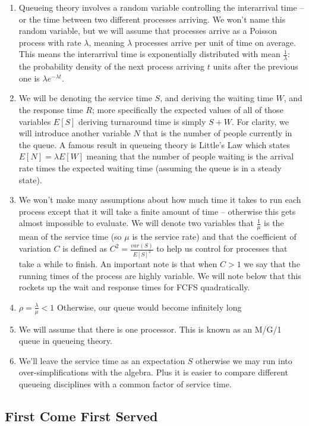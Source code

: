 \begin{enumerate}
\item Queueing theory involves a random variable controlling the interarrival time -- or the time between two different processes arriving.
  We won't name this random variable, but we will assume that processes arrive as a Poisson process with rate $\lambda$, meaning $\lambda$ processes arrive per unit of time on average.
  This means the interarrival time is exponentially distributed with mean $\frac{1}{\lambda}$: the probability density of the next process arriving $t$ units after the previous one is $\lambda e^{-\lambda t}$.
\item We will be denoting the service time $S$, and deriving the waiting time $W$, and the response time $R$; more specifically the expected values of all of those variables $E[S]$ deriving turnaround time is simply $S + W$.
  For clarity, we will introduce another variable $N$ that is the number of people currently in the queue.
  A famous result in queueing theory is Little's Law which states $E[N] = \lambda E[W]$ meaning that the number of people waiting is the arrival rate times the expected waiting time (assuming the queue is in a steady state).
\item We won't make many assumptions about how much time it takes to run each process except that it will take a finite amount of time -- otherwise this gets almost impossible to evaluate.
We will denote two variables that $\frac{1}{\mu}$ is the mean of the service time (so $\mu$ is the service rate) and that the coefficient of variation $C$ is defined as $C^2 = \frac{var(S)}{E[S]^2}$ to help us control for processes that take a while to finish.
An important note is that when $C > 1$ we say that the running times of the process are highly variable. We will note below that this rockets up the wait and response times for FCFS quadratically.
\item $\rho = \frac{\lambda}{\mu} < 1$ Otherwise, our queue would become infinitely long
\item We will assume that there is one processor. This is known as an M/G/1 queue in queueing theory.
\item We'll leave the service time as an expectation $S$ otherwise we may run into over-simplifications with the algebra.
  Plus it is easier to compare different queueing disciplines with a common factor of service time.
\end{enumerate}

\subsection{First Come First Served}

